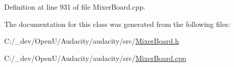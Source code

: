 Definition at line 931 of file Mixer\+Board.\+cpp.



The documentation for this class was generated from the following files\+:\begin{DoxyCompactItemize}
\item 
C\+:/\+\_\+dev/\+Open\+U/\+Audacity/audacity/src/\hyperlink{_mixer_board_8h}{Mixer\+Board.\+h}\item 
C\+:/\+\_\+dev/\+Open\+U/\+Audacity/audacity/src/\hyperlink{_mixer_board_8cpp}{Mixer\+Board.\+cpp}\end{DoxyCompactItemize}
